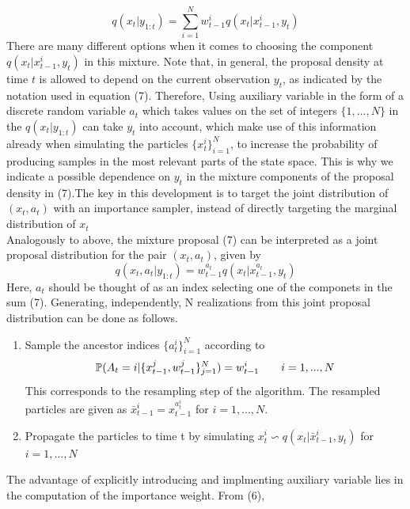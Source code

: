 \documentclass[11pt,oneside,a4paper]{article}
\begin{document}
\begin{equation}
q(x_{t}|y_{1:t}) = \sum_{i=1}^N w_{t-1}^i q(x_t|x_{t-1}^i,y_t)
\end{equation}
There are many different options when it comes to choosing the component $q(x_{t}|x_{t-1}^{i}, y_{t}) $ in this mixture. Note that, in general, the proposal density at time $t $ is allowed to depend on the current
observation $y_{t} $, as indicated by the notation used in equation (7). Therefore, Using auxiliary variable in the form of a discrete random variable $a_{t} $ which takes values on the set of integers $\{ 1,...,N\} $ in the $q(x_t|y_{1:t}) $ can take $y_{t} $ into account, which make use of this information already when simulating
the particles $\{ x_{t}^{i} \}_{i=1}^{N} $, to increase the probability of producing samples in the most relevant parts of the state space. This is why we indicate a possible dependence on $y_{t} $ in the mixture components of
the proposal density in (7).The key in this development is to target the joint distribution of $(x_{t}, a_{t}) $ with an importance sampler, instead of directly targeting the marginal
distribution of $x_{t} $\\
Analogously to above, the mixture proposal (7) can be interpreted as a joint proposal distribution for the pair $(x_{t}, a_{t}) $, given by
\begin{equation}
q(x_{t}, a_{t} | y_{1:t}) = w_{t-1}^{a_t}q(x_{t}|x_{t-1}^{a_{t}}, y_{t})
\end{equation}
Here, $a_{t} $ should be thought of as an index selecting one of the componets in the sum (7).
Generating, independently, N realizations from this joint proposal distribution can be done as follows.
\flushleft
\begin{enumerate}
\item Sample the ancestor indices $ \{ a_{t}^{i} \}_{i=1}^{N} $ according to
\begin{equation}
\mathbb{P} (A_{t} = i \arrowvert \{ x_{t-1}^{j}, w_{t-1}^{j} \}_{j=1}^{N} ) = w_{t-1}^{i} \qquad i = 1,...,N
\end{equation}
This corresponds to the resampling step of the algorithm. The resampled particles are given as $ \bar{x}_{t-1}^{i} = x_{t-1}^{a_{t}^{i}} $ for $ i = 1,...,N $.
\item Propagate the particles to time t by simulating $x_{t}^{i} \backsim q(x_{t}| \bar{x}_{t-1}^{i}, y_{t}) $ for $i = 1,...,N $
\end{enumerate}
The advantage of explicitly introducing and implmenting auxiliary variable lies in the computation of the importance weight. From (6),
\end{document}
